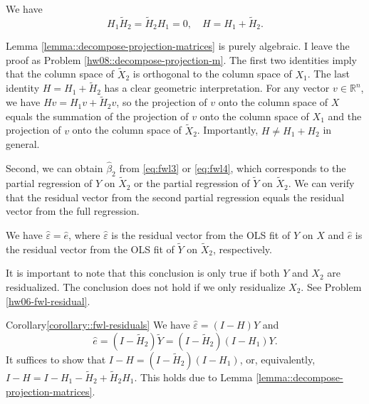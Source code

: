 \begin{lemma}
\label{lemma::decompose-projection-matrices}
We have
$$
H_1 \tilde{H}_2  = \tilde{H}_2  H_1 = 0,\quad
H = H_1 +  \tilde{H}_2. 
$$
\end{lemma}

Lemma \ref{lemma::decompose-projection-matrices} is purely algebraic. I leave the proof as Problem \ref{hw08::decompose-projection-m}. The first two identities imply that the column space of $\tilde{X}_{2}$ is orthogonal to the column space of $X_1$.  The last identity $H = H_1 +  \tilde{H}_2$ has a clear geometric interpretation. For any vector $v \in \mathbb{R}^n$, we have $Hv = H_1v +  \tilde{H}_2v$, so the projection of $v$ onto the column space of $X$ equals the summation of the projection of $v$ onto the column space of $X_1$ and the projection of $v$ onto the column space of $\tilde{X}_{2}$. Importantly, $H \neq H_1 + H_2$ in general. 



Second, we can obtain $\hat{\beta}_2$ from \eqref{eq:fwl3} or \eqref{eq:fwl4}, which corresponds to the partial regression of $Y$ on $\tilde{X}_{2}$ or the partial regression of $\tilde{Y}$ on $\tilde{X}_{2}$. We can verify that the residual vector from the second partial regression equals the residual vector from the full regression. 

\begin{corollary}
\label{corollary::fwl-residuals}
We have $\hat{\varepsilon} = \hat{e}$, where $\hat{\varepsilon}$ is the residual vector from the OLS fit of $Y$ on $X$ and $\hat{e}$ is the residual vector from the OLS fit of $\tilde{Y}$ on $\tilde{X}_{2}$, respectively. 
\end{corollary} 

It is important to note that this conclusion is only true if both $Y$ and $X_2$ are residualized. The conclusion does not hold if we only residualize $X_2$. See Problem \ref{hw06-fwl-residual}. 



\begin{myproof}{Corollary}{\ref{corollary::fwl-residuals}}
We have $\hat{ \varepsilon} = (I-H)Y$ and 
$$
\hat{e}= (I-\tilde{H}_2) \tilde{Y} = (I- \tilde{H}_2)(I-H_1) Y .
$$ 
It suffices to show that $I-H = (I- \tilde{H}_2)(I-H_1)$, or, equivalently, $ I-H =  I - H_1 - \tilde{H}_2 + \tilde{H}_2 H_1$. This holds due to Lemma \ref{lemma::decompose-projection-matrices}. 
\end{myproof}

